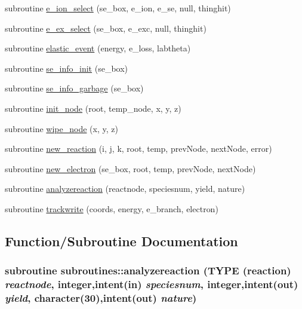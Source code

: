 \begin{DoxyCompactItemize}
\item 
subroutine \hyperlink{namespacesubroutines_acad777e3f27acb4f7e0f7b35035ae54a}{e\_\-ion\_\-select} (se\_\-box, e\_\-ion, e\_\-se, null, thinghit)
\item 
subroutine \hyperlink{namespacesubroutines_a0f09eb60b63730612ddd7801066ce49b}{e\_\-ex\_\-select} (se\_\-box, e\_\-exc, null, thinghit)
\item 
subroutine \hyperlink{namespacesubroutines_a10f3c575d44eedaf9b0a95ed9a64e3ab}{elastic\_\-event} (energy, e\_\-loss, labtheta)
\item 
subroutine \hyperlink{namespacesubroutines_aece587c9d144811189bd1ccf8a59f189}{se\_\-info\_\-init} (se\_\-box)
\item 
subroutine \hyperlink{namespacesubroutines_a1d1775ee81394d8c078c760678a530e2}{se\_\-info\_\-garbage} (se\_\-box)
\item 
subroutine \hyperlink{namespacesubroutines_a4d9b1fbbdcfc2b420201a7ca71c4e782}{init\_\-node} (root, temp\_\-node, x, y, z)
\item 
subroutine \hyperlink{namespacesubroutines_a7580fc0416f20d44b3cfa79ebc20a839}{wipe\_\-node} (x, y, z)
\item 
subroutine \hyperlink{namespacesubroutines_a5f9a688681311ebc691561ec51015d0f}{new\_\-reaction} (i, j, k, root, temp, prevNode, nextNode, error)
\item 
subroutine \hyperlink{namespacesubroutines_ae942148085820c335aea6798ad4e7e7e}{new\_\-electron} (se\_\-box, root, temp, prevNode, nextNode)
\item 
subroutine \hyperlink{namespacesubroutines_aae3cb4fad8f95b0869777449a6bc496f}{analyzereaction} (reactnode, speciesnum, yield, nature)
\item 
subroutine \hyperlink{namespacesubroutines_abbce0f7ec92c43ac91db25f512531642}{trackwrite} (coords, energy, e\_\-branch, electron)
\end{DoxyCompactItemize}


\subsection{Function/Subroutine Documentation}
\hypertarget{namespacesubroutines_aae3cb4fad8f95b0869777449a6bc496f}{
\subsubsection[{analyzereaction}]{\setlength{\rightskip}{0pt plus 5cm}subroutine subroutines::analyzereaction (TYPE (reaction) {\em reactnode}, \/  integer,intent(in) {\em speciesnum}, \/  integer,intent(out) {\em yield}, \/  character(30),intent(out) {\em nature})}}
\label{namespacesubroutines_aae3cb4fad8f95b0869777449a6bc496f}


